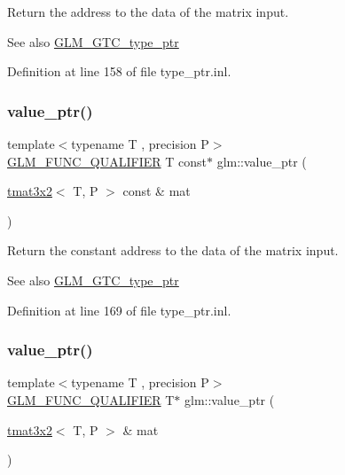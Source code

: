 Return the address to the data of the matrix input. \begin{DoxySeeAlso}{See also}
\mbox{\hyperlink{group__gtc__type__ptr}{G\+L\+M\+\_\+\+G\+T\+C\+\_\+type\+\_\+ptr}} 
\end{DoxySeeAlso}


Definition at line 158 of file type\+\_\+ptr.\+inl.

\mbox{\label{group__gtc__type__ptr_ga398202d6ce304deb7da50badde85ee41}} 
\subsubsection{\texorpdfstring{value\_ptr()}{value\_ptr()}\hspace{0.1cm}{\footnotesize\ttfamily [16/27]}}
{\footnotesize\ttfamily template$<$typename T , precision P$>$ \\
\mbox{\hyperlink{setup_8hpp_a33fdea6f91c5f834105f7415e2a64407}{G\+L\+M\+\_\+\+F\+U\+N\+C\+\_\+\+Q\+U\+A\+L\+I\+F\+I\+ER}} T const$\ast$ glm\+::value\+\_\+ptr (\begin{DoxyParamCaption}\item[{\mbox{\hyperlink{structglm_1_1tmat3x2}{tmat3x2}}$<$ T, P $>$ const \&}]{mat }\end{DoxyParamCaption})}

Return the constant address to the data of the matrix input. \begin{DoxySeeAlso}{See also}
\mbox{\hyperlink{group__gtc__type__ptr}{G\+L\+M\+\_\+\+G\+T\+C\+\_\+type\+\_\+ptr}} 
\end{DoxySeeAlso}


Definition at line 169 of file type\+\_\+ptr.\+inl.

\mbox{\label{group__gtc__type__ptr_gad6a737f57febdef255873f6a44d0db0e}} 
\subsubsection{\texorpdfstring{value\_ptr()}{value\_ptr()}\hspace{0.1cm}{\footnotesize\ttfamily [17/27]}}
{\footnotesize\ttfamily template$<$typename T , precision P$>$ \\
\mbox{\hyperlink{setup_8hpp_a33fdea6f91c5f834105f7415e2a64407}{G\+L\+M\+\_\+\+F\+U\+N\+C\+\_\+\+Q\+U\+A\+L\+I\+F\+I\+ER}} T$\ast$ glm\+::value\+\_\+ptr (\begin{DoxyParamCaption}\item[{\mbox{\hyperlink{structglm_1_1tmat3x2}{tmat3x2}}$<$ T, P $>$ \&}]{mat }\end{DoxyParamCaption})}

